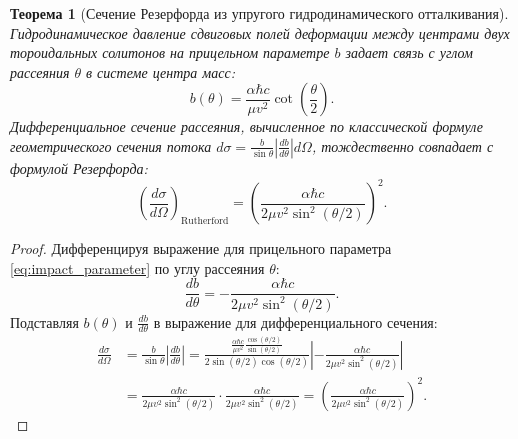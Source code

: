 \documentclass[11pt,a4paper,oneside]{article}
\theoremstyle{plain}
\newtheorem{theorem}{Теорема}[section]
\theoremstyle{definition}
\theoremstyle{remark}
\numberwithin{equation}{section}
\begin{document}
	\begin{theorem}[Сечение Резерфорда из упругого гидродинамического отталкивания]
		Гидродинамическое давление сдвиговых полей деформации между центрами двух тороидальных солитонов на прицельном параметре $b$ задает связь с углом рассеяния $\theta$ в системе центра масс:
		\begin{equation}
			b(\theta) = \frac{\alpha \hbar c}{\mu v^2} \cot\left(\frac{\theta}{2}\right).
			\label{eq:impact_parameter}
		\end{equation}
		Дифференциальное сечение рассеяния, вычисленное по классической формуле геометрического сечения потока $d\sigma = \frac{b}{\sin\theta} \left| \frac{db}{d\theta} \right| d\Omega$, тождественно совпадает с формулой Резерфорда:
		\begin{equation}
			\left( \frac{d\sigma}{d\Omega} \right)_{\text{Rutherford}} = \left( \frac{\alpha \hbar c}{2 \mu v^2 \sin^2(\theta/2)} \right)^2.
			\label{eq:rutherford_cross_section}
		\end{equation}
	\end{theorem}
	
	\begin{proof}
		Дифференцируя выражение для прицельного параметра \eqref{eq:impact_parameter} по углу рассеяния $\theta$:
		\begin{equation}
			\frac{db}{d\theta} = -\frac{\alpha \hbar c}{2 \mu v^2 \sin^2(\theta/2)}.
		\end{equation}
		Подставляя $b(\theta)$ и $\frac{db}{d\theta}$ в выражение для дифференциального сечения:
		\begin{align}
			\frac{d\sigma}{d\Omega} &= \frac{b}{\sin\theta} \left| \frac{db}{d\theta} \right| = \frac{\frac{\alpha \hbar c}{\mu v^2} \frac{\cos(\theta/2)}{\sin(\theta/2)}}{2 \sin(\theta/2)\cos(\theta/2)} \left| -\frac{\alpha \hbar c}{2 \mu v^2 \sin^2(\theta/2)} \right| \nonumber \\
			&= \frac{\alpha \hbar c}{2 \mu v^2 \sin^2(\theta/2)} \cdot \frac{\alpha \hbar c}{2 \mu v^2 \sin^2(\theta/2)} = \left( \frac{\alpha \hbar c}{2 \mu v^2 \sin^2(\theta/2)} \right)^2.
		\end{align}
	\end{proof}
	
\end{document}

